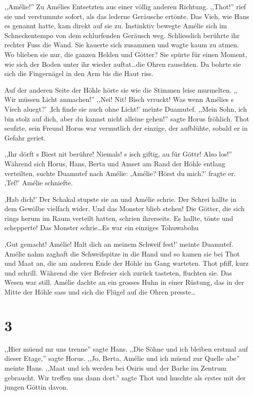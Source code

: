 \documentclass[11pt,titlepage,a5paper]{book}
\begin{document}
,,Amélie!'' Zu Amélies Entsetzten aus einer völlig anderen Richtung. ,,Thot!'' rief sie und verstummte sofort, als das lederne Geräusche ertönte. Das Vieh, wie Hans es genannt hatte, kam direkt auf sie zu. Instinktiv bewegte Amélie sich im Schneckentempo von dem schlurfenden Geräusch weg. Schliesslich berührte ihr rechter Fuss die Wand. Sie kauerte sich zusammen und wagte kaum zu atmen. Wo blieben sie nur, die ganzen Helden und Götter? Sie spürte für einen Moment, wie sich der Boden unter ihr wieder auftat\dots die Ohren rauschten. Da bohrte sie sich die Fingernägel in den Arm bis die Haut riss.

Auf der anderen Seite der Höhle hörte sie wie die Stimmen leise murmelten. ,, Wir müssen Licht anmachen!'' ,,Nei! Nit! Bisch vrruckt! Was wenn Amélies s Viech aluegt?' ,Ich finde sie auch ohne Licht!' meinte Duamutef. ,,Mein Sohn, ich bin stolz auf dich, aber du kannst nicht alleine gehen!'' sagte Horus fröhlich. Thot seufzte, sein Freund Horus war vermutlich der einzige, der aufblühte, sobald er in Gefahr geriet.

,,Ihr dörft s Biest nit berühre! Niemals! s isch giftig, au für Göttr! Also los!'' Während sich Horus, Hans, Berta und Amset am Rand der Höhle entlang verteilten, suchte Duamutef nach Amélie: ,Amélie? Hörst du mich?' fragte er. ,Tef!' Amélie schniefte. 

,Hab dich!' Der Schakal stupste sie an und Amélie schrie. Der Schrei hallte in dem Gewölbe vielfach wider. Und das Monster blieb stehen! Die Götter, die sich rings herum im Raum verteilt hatten, schrien ihrerseits. Es hallte, tönte und schepperte! Das Monster schrie\dots Es war ein einziges Tohuwabohu

,Gut gemacht! Amélie! Halt dich an meinem Schweif fest!' meinte Duamutef. Amélie nahm zaghaft die Schweifspitze in die Hand und so kamen sie bei Thot und Maat an, die am anderen Ende der Höhle im Gang warteten. Thot pfiff, kurz und schrill. Während die vier Befreier sich zurück tasteten, fluchten sie. Das Wesen war still. Amélie dachte an ein grosses Huhn in einer Rüstung, das in der Mitte der Höhle sass und sich die Flügel auf die Ohren presste\dots 

\section*{3}

,,Hier müend mr uns trenne'' sagte Hans. ,,Die Söhne und ich bleiben erstmal auf dieser Etage,'' sagte Horus. ,,Jo, Berta, Amélie und ich müend zur Quelle abe'' meinte Hans. ,,Maat und ich werden bei Osiris und der Barke im Zentrum gebraucht. Wir treffen uns dann dort.'' sagte Thot und huschte als erstes mit der jungen Göttin davon.
\end{document}
